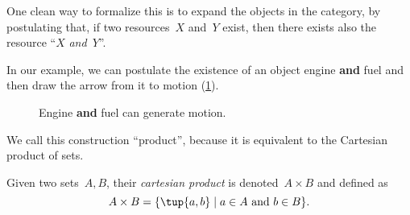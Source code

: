One clean way to formalize this is to expand the objects in the category, by postulating that, if two resources~$X$ and~$Y$ exist, then there exists also the resource ``$X$ \emph{and}~$Y$''.

In our example, we can postulate the existence of an object \textsf{engine} \textbf{ and }\textsf{fuel} and then draw the arrow from it to motion (\cref{fig:e13}).

\begin{figure}[h!]
    \centering
    \caption{Engine \textbf{and} fuel can generate motion. \label{fig:e13}}
\end{figure}

We call this construction ``product'', because it is equivalent to the Cartesian product of sets.


\begin{comment}
Suppose that we are considering a hybrid car that contains two engines: an
electric engine and an internal combustion engine. Both can produce \textsf{motion}, but each from a different source of energy. The electric engine uses \textsf{electric energy}; the internal combustion engine uses \textsf{gasoline}. The situation is as in \cref{fig:e16a}.

\begin{figure}[h!]
    \centering
    \includesag{30_dpcatfig_e14}
    \caption{Alternative ways to generate $\mathsf{motion}$. \label{fig:e16a}}
\end{figure}

From this we would like to conclude that we can obtain \textsf{motion} from \textbf{either} \textsf{gasoline} \textbf{or} \textsf{electric energy} (\cref{fig:e16b}).

\begin{figure}[h!]
    \centering
    \includesag{30_dpcatfig_e15}
    \caption{We can generate $\mathsf{motion}$ from either $\mathsf{gasoline}$ or $\mathsf{electric} \ \mathsf{energy}$. \label{fig:e16b}}
\end{figure}

To define the idea of ``\textbf{either} \textsf{gasoline} \textbf{or} \textsf{electric energy}'' we can refer to the idea of disjoint union of sets (\cref{def:disjoint-union}).
\end{comment}

\begin{definition}
\label{def:cartesian-product}
   Given two sets~$A,B$, their \emph{cartesian product} is denoted~$A\times  B$
   and defined as 
   \begin{equation}
       A\times  B=\{ \tup{a,b}\mid a\in A\text{ and } b\in B\}.
   \end{equation}
\end{definition}

